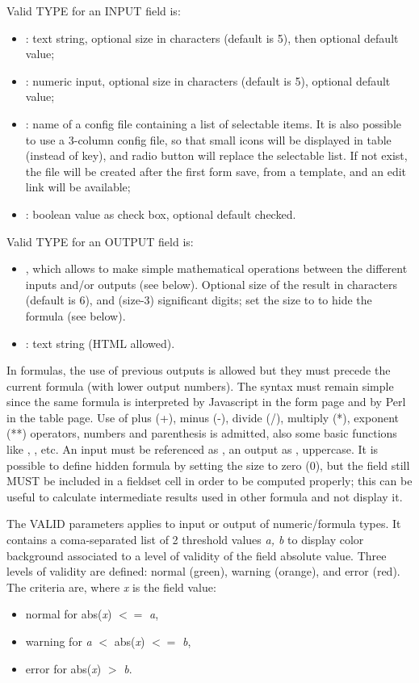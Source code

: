 Valid TYPE for an INPUT field is:
\begin{itemize}
	\item {} : text string, optional size in characters (default is 5), then optional default value;
	\item {}: numeric input, optional size in characters (default is 5), optional default value;
	\item {}: name of a config file containing a  list of selectable items. It is also possible to use a  3-column config file, so that small icons will be displayed in table (instead of key), and radio button will replace the selectable list. If not exist, the file will be created after the first form save, from a template, and an edit link will be available;
	\item {}: boolean value as check box, optional default checked.
\end{itemize}

Valid TYPE for an OUTPUT field is:
\begin{itemize}
	\item {}, which allows to make simple mathematical operations between the different inputs and/or outputs (see below). Optional size of the result in characters (default is 6), and (size-3) significant digits; set the size to  to hide the formula (see below).
	\item {} : text string (HTML allowed).
\end{itemize}

In formulas, the use of previous outputs is allowed but they must precede the current formula (with lower output numbers). The syntax must remain simple since the same formula is interpreted by Javascript in the form page and by Perl in the table page. Use of plus (+), minus (-), divide (/), multiply (*), exponent (**) operators, numbers and parenthesis is admitted, also some basic functions like , , etc. An input must be referenced as , an output as , uppercase. It is possible to define hidden formula by setting the size to zero (0), but the field still MUST be included in a fieldset cell in order to be computed properly; this can be useful to calculate intermediate results used in other formula and not display it.
 
The VALID parameters applies to input or output of numeric/formula types. It contains a coma-separated list of 2 threshold values {\it a, b} to display color background associated to a level of validity of the field absolute value. Three levels of validity are defined: normal (green), warning (orange), and error (red). The criteria are, where {\it x} is the field value:
\begin{itemize}
	\item normal for abs({\it x}) $<=$ {\it a},
	\item warning for {\it a} $<$ abs({\it x}) $<=$ {\it b},
	\item error for abs({\it x}) $>$ {\it b}.
\end{itemize}

